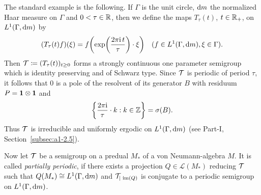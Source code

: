 The standard example is the following.
If\/ $\Gamma$  is the unit circle, $ \mathop{}\!\mathrm{d}{m} $  the normalized Haar measure on $\Gamma$  and $ 0 < \tau \in \mathbb{R} $, then we define the maps $ T_{\tau}(t) $, $ t \in \mathbb{R}_{+} $, on $ L^{1}(\Gamma, \mathop{}\!\mathrm{d}{m}) $  by
\[
(T_{\tau}(t)f)(\xi) = f\mleft( \exp\mleft(\frac{2\pi \iu  \, t }{\tau} \mright) \cdot \xi \mright) \quad (f \in L^{1}(\Gamma ,\dm), \xi \in \Gamma).
\]
%
%
Then $ \TT \coloneqq (T_{\tau}(t))_{t \geq 0} $  forms a strongly continuous one parameter semigroup which is identity preserving and of Schwarz type.
Since $ \mathcal{T} $  is periodic of period $ \tau $, it follows that 0 is a pole of the resolvent of its generator $ B $  with residuum $ P = \mathbf{1} \otimes \mathbf{1} $  and %
\[
	\left\{\frac{2\pi \mathrm{i}}{\tau} \cdot k: k \in \mathbb{Z} \right\} = \sigma(B) .
\]
%
Thus $ \mathcal{T} $  is irreducible and uniformly ergodic on $ L^{1}(\Gamma ,\mathop{}\!\mathrm{d}{m}) $  
(see Part-I, Section~\ref{subsec:a1-2.5}).

Now let $ \mathcal{T} $  be a semigroup on a predual $ M_{*} $ of a von Neumann-algebra $ M $.
It is called \emph{partially periodic}, if there exists a projection $ Q \in \mathcal{L}(M_{*}) $  reducing $ \mathcal{T} $  such that $ Q(M_{*}) \cong L^{1}(\Gamma,\mathop{}\!\mathrm{d}{m}) $  and $ \mathcal{T}_{| \mathop{}\mathrm{im}(Q)} $  is conjugate to a periodic semigroup on $ L^{1}(\Gamma ,\mathop{}\!\mathrm{d}{m}) $.

